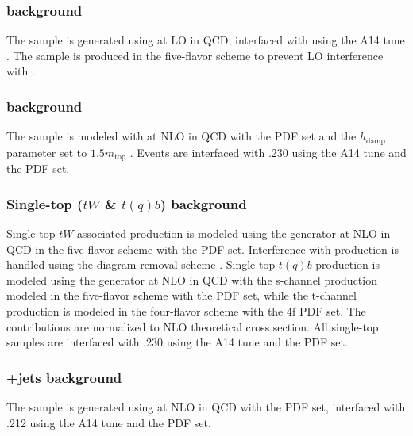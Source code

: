 \documentclass[../thesis.tex]{subfiles}
\begin{document}
\subsubsection*{\ttt background}
The \ttt sample is generated using \mgamc \citep{Alwall:2014hca} at \acs{LO} in \acs{QCD}, interfaced with \pythia \citep{Sjostrand:2014zea} using the A14 tune \citep{ATL-PHYS-PUB-2014-021}. The sample is produced in the five-flavor scheme \citep{Alekhin_2010} to prevent \acs{LO} interference with \tttt.
\subsubsection*{\ttbar background}
The \ttbar sample is modeled with \powhegbox \citep{Frixione:2007nw,Nason:2004rx,Frixione:2007vw,Alioli:2010xd} at \acs{NLO} in \acs{QCD} with the \nnpdfnlo \citep{Ball:2014uwa} \acs{PDF} set and the $h_\text{damp}$ parameter set to $1.5m_\text{top}$ \citep{ATL-PHYS-PUB-2016-020}. Events are interfaced with \pythia.230 \citep{Sjostrand:2014zea} using the A14 tune \citep{ATL-PHYS-PUB-2014-021} and the \nnpdftwo \citep{Ball:2012cx} \acs{PDF} set.
\subsubsection*{Single-top ($tW$ \& $t(q)b$) background}
Single-top $tW$-associated production is modeled using the \powhegbox generator \citep{Frixione:2007nw,Nason:2004rx,Frixione:2007vw,Alioli:2010xd} at \acs{NLO} in \acs{QCD} in the five-flavor scheme \citep{Alekhin_2010} with the \nnpdfnlo \citep{Ball:2014uwa} \acs{PDF} set. Interference with \ttbar production \citep{ATL-PHYS-PUB-2016-020} is handled using the diagram removal scheme \citep{Frixione:2008yi}. Single-top $t(q)b$ production is modeled using the \powhegbox generator at \acs{NLO} in \acs{QCD} with the s-channel production modeled in the five-flavor scheme with the \nnpdfnlo \acs{PDF} set, while the t-channel production is modeled in the four-flavor scheme with the \nnpdfnlo 4f \citep{Ball:2014uwa} \acs{PDF} set. The \ttWW contributions are normalized to \acs{NLO} theoretical cross section. All single-top samples are interfaced with \pythia.230 \citep{Sjostrand:2014zea} using the A14 tune \citep{ATL-PHYS-PUB-2014-021} and the \nnpdftwo \citep{Ball:2012cx} \acs{PDF} set.
\subsubsection*{\tWZ +jets background}
The \tWZ sample is generated using \mgamc \citep{Alwall:2014hca} at \acs{NLO} in \acs{QCD} with the \nnpdfnlo \citep{Ball:2014uwa} \acs{PDF} set, interfaced with \pythia.212 \citep{Sjostrand:2014zea} using the A14 tune \citep{ATL-PHYS-PUB-2014-021} and the \nnpdftwo \citep{Ball:2012cx} \acs{PDF} set.
\end{document}
